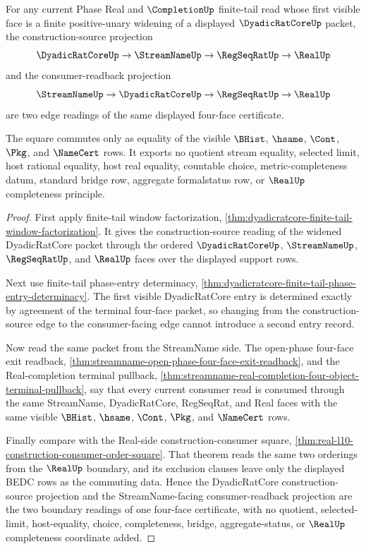 \begin{theorem}
\label{thm:dyadicratcore-finite-tail-consumer-order-square}
For any current Phase Real and $\CompletionUp$ finite-tail read whose first visible face is a finite positive-unary widening of a displayed $\DyadicRatCoreUp$ packet, the construction-source projection
$$
\DyadicRatCoreUp \to \StreamNameUp \to \RegSeqRatUp \to \RealUp
$$
and the consumer-readback projection
$$
\StreamNameUp \to \DyadicRatCoreUp \to \RegSeqRatUp \to \RealUp
$$
are two edge readings of the same displayed four-face certificate.

The square commutes only as equality of the visible $\BHist$, $\hsame$, $\Cont$, $\Pkg$, and $\NameCert$ rows. It exports no quotient stream equality, selected limit, host rational equality, host real equality, countable choice, metric-completeness datum, standard bridge row, aggregate formalstatus row, or $\RealUp$ completeness principle.
\end{theorem}
\begin{proof}
First apply finite-tail window factorization, \autoref{thm:dyadicratcore-finite-tail-window-factorization}. It gives the construction-source reading of the widened DyadicRatCore packet through the ordered $\DyadicRatCoreUp$, $\StreamNameUp$, $\RegSeqRatUp$, and $\RealUp$ faces over the displayed support rows.

Next use finite-tail phase-entry determinacy, \autoref{thm:dyadicratcore-finite-tail-phase-entry-determinacy}. The first visible DyadicRatCore entry is determined exactly by agreement of the terminal four-face packet, so changing from the construction-source edge to the consumer-facing edge cannot introduce a second entry record.

Now read the same packet from the StreamName side. The open-phase four-face exit readback, \autoref{thm:streamname-open-phase-four-face-exit-readback}, and the Real-completion terminal pullback, \autoref{thm:streamname-real-completion-four-object-terminal-pullback}, say that every current consumer read is consumed through the same StreamName, DyadicRatCore, RegSeqRat, and Real faces with the same visible $\BHist$, $\hsame$, $\Cont$, $\Pkg$, and $\NameCert$ rows.

Finally compare with the Real-side construction-consumer square, \autoref{thm:real-l10-construction-consumer-order-square}. That theorem reads the same two orderings from the $\RealUp$ boundary, and its exclusion clauses leave only the displayed BEDC rows as the commuting data. Hence the DyadicRatCore construction-source projection and the StreamName-facing consumer-readback projection are the two boundary readings of one four-face certificate, with no quotient, selected-limit, host-equality, choice, completeness, bridge, aggregate-status, or $\RealUp$ completeness coordinate added.
\end{proof}
